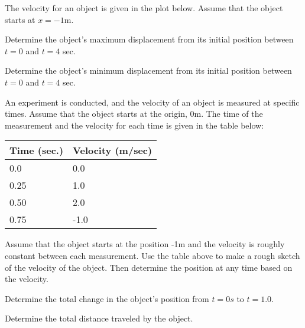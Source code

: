 \begin{problem}
\item The velocity for an object is given in the plot below. Assume
  that the object starts at $x=-1$m.

    \scalebox{0.7}{}

    \begin{subproblem}
    \item Determine the object's maximum displacement from its initial
      position between $t=0$ and $t=4$ sec.
      \vfill
    \item Determine the object's minimum displacement from its initial
      position between $t=0$ and $t=4$ sec.
      \vfill
    \end{subproblem}

\clearpage

\item An experiment is conducted, and the velocity of an object is
  measured at specific times. Assume that the object starts at the
  origin, 0m. The time of the measurement and the
  velocity for each time is given in the table below: \\
  \begin{tabular}{l|l}
    Time (sec.) & Velocity (m/sec) \\ \hline
    0.0  &  0.0 \\
    0.25 &  1.0 \\
    0.50 &  2.0 \\
    0.75 & -1.0 \\
  \end{tabular}

  \begin{subproblem}
  \item Assume that the object starts at the position -1m and the
    velocity is roughly constant between each measurement. Use the
    table above to make a rough sketch of the velocity of the
    object. Then determine the position at any time based on the
    velocity.

    \scalebox{0.7}{}

  \item Determine the total change in the object's position from $t=0s$
    to $t=1.0$.

    \vfill

  \item Determine the total distance traveled by the object.

    \vfill

  \end{subproblem}



\end{problem}


